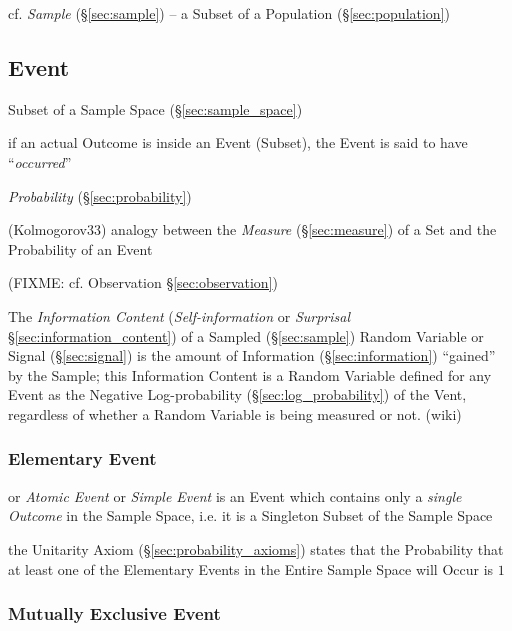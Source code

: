 \fist cf. \emph{Sample} (\S\ref{sec:sample}) -- a Subset of a Population
(\S\ref{sec:population})



\subsection{Event}\label{sec:probability_event}

Subset of a Sample Space (\S\ref{sec:sample_space})

if an actual Outcome is inside an Event (Subset), the Event is said to have
``\emph{occurred}''

\emph{Probability} (\S\ref{sec:probability})

(Kolmogorov33) analogy between the \emph{Measure} (\S\ref{sec:measure}) of a Set
and the Probability of an Event

(FIXME: cf. Observation \S\ref{sec:observation})

The \emph{Information Content} (\emph{Self-information} or \emph{Surprisal}
\S\ref{sec:information_content}) of a Sampled (\S\ref{sec:sample}) Random
Variable or Signal (\S\ref{sec:signal}) is the amount of Information
(\S\ref{sec:information}) ``gained'' by the Sample; this Information Content is
a Random Variable defined for any Event as the Negative Log-probability
(\S\ref{sec:log_probability}) of the Vent, regardless of whether a Random
Variable is being measured or not. (wiki)



\subsubsection{Elementary Event}\label{sec:elementary_event}

or \emph{Atomic Event} or \emph{Simple Event} is an Event which contains only a
\emph{single Outcome} in the Sample Space, i.e. it is a Singleton Subset of the
Sample Space

the Unitarity Axiom (\S\ref{sec:probability_axioms}) states that the
Probability that at least one of the Elementary Events in the Entire Sample
Space will Occur is $1$



\subsubsection{Mutually Exclusive Event}\label{sec:mutually_exclusive}

